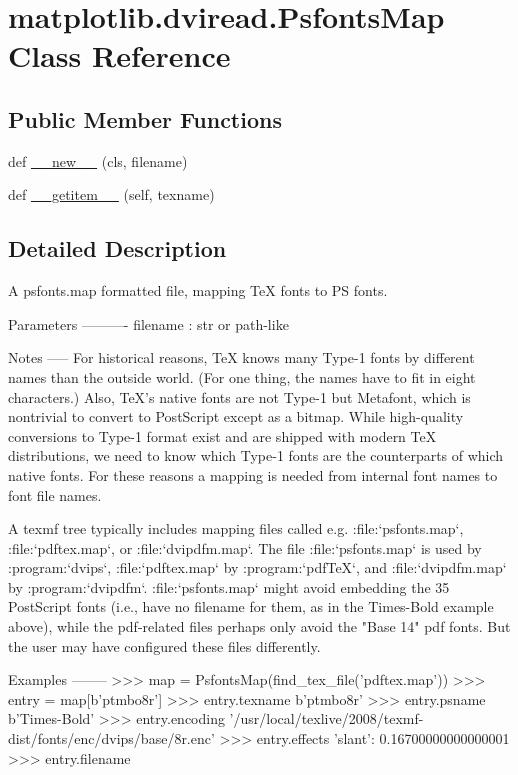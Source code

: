 \hypertarget{classmatplotlib_1_1dviread_1_1PsfontsMap}{}\section{matplotlib.\+dviread.\+Psfonts\+Map Class Reference}
\label{classmatplotlib_1_1dviread_1_1PsfontsMap}
\subsection*{Public Member Functions}
\begin{DoxyCompactItemize}
\item 
def \hyperlink{classmatplotlib_1_1dviread_1_1PsfontsMap_a9087664b44314da1115fafaa9f3fd36b}{\+\_\+\+\_\+new\+\_\+\+\_\+} (cls, filename)
\item 
def \hyperlink{classmatplotlib_1_1dviread_1_1PsfontsMap_abd474b1ee124efee7a61d7c9adcd8f83}{\+\_\+\+\_\+getitem\+\_\+\+\_\+} (self, texname)
\end{DoxyCompactItemize}


\subsection{Detailed Description}
\begin{DoxyVerb}A psfonts.map formatted file, mapping TeX fonts to PS fonts.

Parameters
----------
filename : str or path-like

Notes
-----
For historical reasons, TeX knows many Type-1 fonts by different
names than the outside world. (For one thing, the names have to
fit in eight characters.) Also, TeX's native fonts are not Type-1
but Metafont, which is nontrivial to convert to PostScript except
as a bitmap. While high-quality conversions to Type-1 format exist
and are shipped with modern TeX distributions, we need to know
which Type-1 fonts are the counterparts of which native fonts. For
these reasons a mapping is needed from internal font names to font
file names.

A texmf tree typically includes mapping files called e.g.
:file:`psfonts.map`, :file:`pdftex.map`, or :file:`dvipdfm.map`.
The file :file:`psfonts.map` is used by :program:`dvips`,
:file:`pdftex.map` by :program:`pdfTeX`, and :file:`dvipdfm.map`
by :program:`dvipdfm`. :file:`psfonts.map` might avoid embedding
the 35 PostScript fonts (i.e., have no filename for them, as in
the Times-Bold example above), while the pdf-related files perhaps
only avoid the "Base 14" pdf fonts. But the user may have
configured these files differently.

Examples
--------
>>> map = PsfontsMap(find_tex_file('pdftex.map'))
>>> entry = map[b'ptmbo8r']
>>> entry.texname
b'ptmbo8r'
>>> entry.psname
b'Times-Bold'
>>> entry.encoding
'/usr/local/texlive/2008/texmf-dist/fonts/enc/dvips/base/8r.enc'
>>> entry.effects
{'slant': 0.16700000000000001}
>>> entry.filename
\end{DoxyVerb}
 

